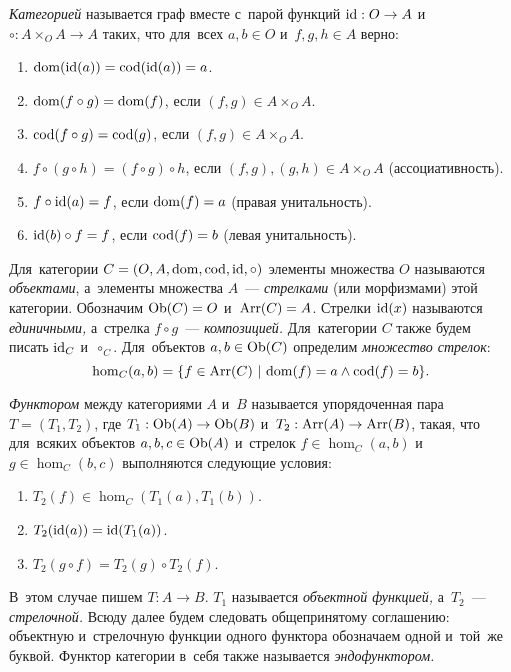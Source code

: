 \documentclass[a4paper,oneside]{article}
\begin{document}
\textit{Категорией} называется граф вместе с~парой функций $\mathrm{id} : O \rightarrow A$
и~$\circ : A \times_O A \rightarrow A$ таких, что для~всех $a, b \in O$ и~$f, g, h \in A$ верно:
\begin{enumerate}
  \item $\mathrm{dom}(\mathrm{id}(a)) = \mathrm{cod}(\mathrm{id}(a)) = a$.
  \item $\mathrm{dom}(f \circ g) = \mathrm{dom}(f)$, если $(f, g) \in A \times_O A$.
  \item $\mathrm{cod}(f \circ g) = \mathrm{cod}(g)$, если $(f, g) \in A \times_O A$.
  \item $f \circ (g \circ h) = (f \circ g) \circ h$, если $(f, g), (g, h) \in A \times_O A$ (ассоциативность).
  \item $f \circ \mathrm{id}(a) = f$, если $\mathrm{dom}(f) = a$ (правая унитальность).
  \item $\mathrm{id}(b) \circ f = f$, если $\mathrm{cod}(f) = b$ (левая унитальность).
\end{enumerate}

Для~категории $C = (O, A, \mathrm{dom}, \mathrm{cod}, \mathrm{id}, \circ)$ элементы множества $O$ называются \textit{объектами},
а~элементы множества $A$~— \textit{стрелками} (или морфизмами) этой категории. Обозначим $\mathrm{Ob}(C) = O$ и~$\mathrm{Arr}(C) = A$.
Стрелки $\mathrm{id}(x)$ называются \textit{единичными,} а~стрелка $f \circ g$~— \textit{композицией.} Для~категории $C$ также будем писать $\mathrm{id}_C$ и~$\circ_C$.
Для~объектов $a, b \in \mathrm{Ob}(C)$ определим \textit{множество стрелок}:
\[
  \hom_C(a, b) = \{ f \in \mathrm{Arr}(C)\ | \ \mathrm{dom}(f) = a \wedge \mathrm{cod}(f) = b \}.
\]

\textit{Функтором} между категориями $A$ и~$B$ называется упорядоченная пара $T = (T_1, T_2)$,
где $T_1 : \mathrm{Ob}(A) \rightarrow \mathrm{Ob}(B)$ и~$T_2 : \mathrm{Arr}(A) \rightarrow \mathrm{Arr}(B)$,
такая, что для~всяких объектов $a, b, c \in \mathrm{Ob}(A)$ и~стрелок $f \in \hom_C(a, b)$ и~$g \in \hom_C(b, c)$ выполняются
следующие условия:
\begin{enumerate}
  \item $T_2(f) \in \hom_C(T_1(a), T_1(b))$.
  \item $T_2(\mathrm{id}(a)) = \mathrm{id}(T_1(a))$.
  \item $T_2(g \circ f) = T_2(g) \circ T_2(f)$.
\end{enumerate}

В~этом случае пишем $T : A \rightarrow B$. $T_1$ называется \textit{объектной функцией,} а~$T_2$~— \textit{стрелочной.}
Всюду далее будем следовать общепринятому соглашению: объектную и~стрелочную функции одного функтора обозначаем одной и~той~же буквой.
Функтор категории в~себя также называется \textit{эндофунктором.}
\end{document}
